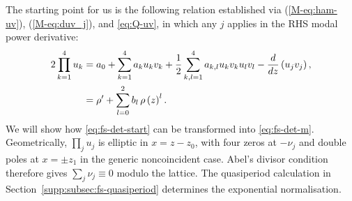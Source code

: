 \documentclass[11pt,a4paper]{article}
\newcommand{\externaleqref}[1]{\textup{(\ref*{#1})}}
\begin{document}
The starting point for us is the following relation established via \externaleqref{M-eq:ham-uv}, \externaleqref{M-eq:duv_j}, and \eqref{eq:Q-uv}, in which any $j$ applies in the RHS modal power derivative:
\begin{align}
2 \prod_{k=1}^{4} u_k &= {a}_{0} + \sum_{k=1}^{4} {a}_{k} u_k v_k  + \frac{1}{2}\sum\limits_{k,l=1}^{4} {a}_{k,l} u_k v_k u_l v_l - \frac{d}{d z}\left(u_j v_j\right), \notag \\
&=\rho' + \sum_{l=0}^{2}b_l\,\rho\left(z\right)^l. \label{eq:fs-det-start}
\end{align}
We will show how \eqref{eq:fs-det-start} can be transformed into \eqref{eq:fs-det-m}.
Geometrically, $\prod_j u_j$ is elliptic in $x=z-z_0$, with four zeros at $-\nu_j$ and double poles at $x=\pm z_1$ in the generic noncoincident case.
Abel's divisor condition therefore gives $\sum_j\nu_j\equiv0$ modulo the lattice.
The quasiperiod calculation in Section~\ref{supp:subsec:fs-quasiperiod} determines the exponential normalisation.
\end{document}
